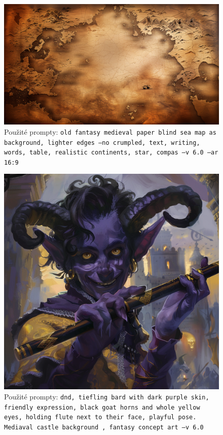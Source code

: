 \begin{figure}
    \centering
    \includegraphics[width=\textwidth]{resources/figures/map.png}
    \caption{Použité prompty: \texttt{old fantasy medieval paper blind sea map as background, lighter edges --no crumpled, text, writing, words, table, realistic continents, star, compas --v 6.0 --ar 16:9}}
    \label{fig:map}
\end{figure}

\begin{figure}[h]
  \centering
  \includegraphics[width=\textwidth]{resources/figures/demonkin-bard.png}
  \caption{Použité prompty: \texttt{dnd, tiefling bard with dark purple skin, friendly expression, black goat horns and whole yellow eyes, holding flute next to their face, playful pose. Mediaval castle background , fantasy concept art --v 6.0}}
  \label{fig:demonkin-bard}
\end{figure}

